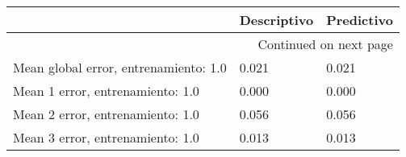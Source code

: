 \begin{longtable}{p{4cm}|p{1.5cm}|p{1.5cm}}
\toprule
{} &  Descriptivo &  Predictivo \\
\midrule
\endhead
\midrule
\multicolumn{3}{r}{{Continued on next page}} \\
\midrule
\endfoot

\bottomrule
\endlastfoot
Mean global error, entrenamiento: 1.0 &        0.021 &       0.021 \\
Mean 1 error, entrenamiento: 1.0      &        0.000 &       0.000 \\
Mean 2 error, entrenamiento: 1.0      &        0.056 &       0.056 \\
Mean 3 error, entrenamiento: 1.0      &        0.013 &       0.013 \\
\end{longtable}
